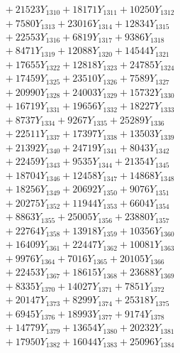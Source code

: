 \documentclass[a4paper,10pt]{article}
\begin{document}
{\begin{align}
&\;  + 21523 Y_{1310} + 18171 Y_{1311} + 10250 Y_{1312} \\[0.3ex]
&\;  + 7580 Y_{1313} + 23016 Y_{1314} + 12834 Y_{1315} \\[0.3ex]
&\;  + 22553 Y_{1316} + 6819 Y_{1317} + 9386 Y_{1318} \\[0.5ex]\allowbreak
&\;  + 8471 Y_{1319} + 12088 Y_{1320} + 14544 Y_{1321} \\[0.3ex]
&\;  + 17655 Y_{1322} + 12818 Y_{1323} + 24785 Y_{1324} \\[0.3ex]
&\;  + 17459 Y_{1325} + 23510 Y_{1326} + 7589 Y_{1327} \\[0.3ex]
&\;  + 20990 Y_{1328} + 24003 Y_{1329} + 15732 Y_{1330} \\[0.3ex]
&\;  + 16719 Y_{1331} + 19656 Y_{1332} + 18227 Y_{1333} \\[0.3ex]
&\;  + 8737 Y_{1334} + 9267 Y_{1335} + 25289 Y_{1336} \\[0.3ex]
&\;  + 22511 Y_{1337} + 17397 Y_{1338} + 13503 Y_{1339} \\[0.3ex]
&\;  + 21392 Y_{1340} + 24719 Y_{1341} + 8043 Y_{1342} \\[0.3ex]
&\;  + 22459 Y_{1343} + 9535 Y_{1344} + 21354 Y_{1345} \\[0.3ex]
&\;  + 18704 Y_{1346} + 12458 Y_{1347} + 14868 Y_{1348} \\[0.5ex]\allowbreak
&\;  + 18256 Y_{1349} + 20692 Y_{1350} + 9076 Y_{1351} \\[0.3ex]
&\;  + 20275 Y_{1352} + 11944 Y_{1353} + 6604 Y_{1354} \\[0.3ex]
&\;  + 8863 Y_{1355} + 25005 Y_{1356} + 23880 Y_{1357} \\[0.3ex]
&\;  + 22764 Y_{1358} + 13918 Y_{1359} + 10356 Y_{1360} \\[0.3ex]
&\;  + 16409 Y_{1361} + 22447 Y_{1362} + 10081 Y_{1363} \\[0.3ex]
&\;  + 9976 Y_{1364} + 7016 Y_{1365} + 20105 Y_{1366} \\[0.3ex]
&\;  + 22453 Y_{1367} + 18615 Y_{1368} + 23688 Y_{1369} \\[0.3ex]
&\;  + 8335 Y_{1370} + 14027 Y_{1371} + 7851 Y_{1372} \\[0.3ex]
&\;  + 20147 Y_{1373} + 8299 Y_{1374} + 25318 Y_{1375} \\[0.3ex]
&\;  + 6945 Y_{1376} + 18993 Y_{1377} + 9174 Y_{1378} \\[0.5ex]\allowbreak
&\;  + 14779 Y_{1379} + 13654 Y_{1380} + 20232 Y_{1381} \\[0.3ex]
&\;  + 17950 Y_{1382} + 16044 Y_{1383} + 25096 Y_{1384} \\[0.3ex]

\end{align}}
\end{document}
